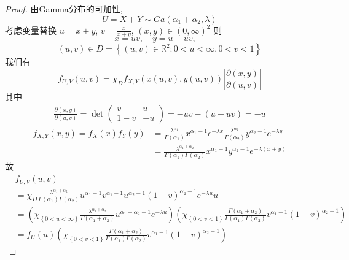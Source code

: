 \documentclass[../main.tex]{subfiles}
\begin{document}
\begin{proof}
  由Gamma分布的可加性, \[
  U= X+ Y\sim Ga\left( \alpha _1 + \alpha _2 , \lambda  \right) 
  \] 考虑变量替换 \(  u= x+ y  \), \(  v= \frac{x}{x+ y}  \), \(  \left( x,y \right)\in \left( 0,\infty \right)^{2}    \) 则   \[
  x= uv,\quad y= u-uv,\quad 
  \] \[
   \left( u,v \right)\in D= \left\{ \left( u,v \right)\in \mathbb{R} ^{2}: 0< u< \infty, 0< v< 1  \right\} 
  \]我们有\[
  f_{U,V}\left( u,v \right)=\chi _{D} f_{X,Y}\left( x\left( u,v \right),y\left( u,v \right)   \right)\left| \frac{\partial \left( x,y \right) }{\partial \left( u,v \right) }   \right| 
  \]其中 \[
  \begin{aligned}
  \frac{\partial \left( x,y \right) }{\partial \left( u,v \right) }= \det \begin{pmatrix} 
      v&u\\ 
       1-v&-u 
  \end{pmatrix}  = -uv-\left( u-uv \right) = -u
  \end{aligned}
  \] \[
  \begin{aligned}
  f_{X,Y}\left( x,y \right)= f_{X}\left( x \right)f_{Y}\left( y \right)&= \frac{ \lambda ^{ \alpha _1 } }{ \Gamma \left(  \alpha _1  \right)  }x^{ \alpha _1  -1}e^{- \lambda x} \frac{ \lambda ^{\alpha _2 } }{ \Gamma \left(  \alpha _2  \right)  }y^{\alpha _2  -1}e^{- \lambda y}  \\ 
   &= \frac{ \lambda ^{\alpha _1 + \alpha _2 } }{ \Gamma \left(  \alpha _1  \right) \Gamma \left(  \alpha _2  \right)   }x^{ \alpha _1  -1} y^{ \alpha _2   -1} e^{- \lambda \left( x+ y \right) } 
  \end{aligned} 
  \]故 \[
  \begin{aligned}
 & f_{U,V}\left( u,v \right)\\ 
  &= \chi _{D} \frac{ \lambda ^{\alpha _1 + \alpha _2 } }{ \Gamma \left(  \alpha _1  \right) \Gamma \left( \alpha _2  \right)   }   u^{\alpha _1   -1}v^{ \alpha _1 -1}u^{\alpha _2 -1}\left( 1-v \right)^{ \alpha _2 -1} e^{- \lambda u}u\\ 
   &= \left( \chi _{\left\{ 0< u< \infty \right\}}\frac{ \lambda ^{\alpha _1 + \alpha _2 } }{ \Gamma \left( \alpha _1 + \alpha _2  \right)  } u^{ \alpha _1 + \alpha _2 -1}e^{- \lambda u} \right) \left( \chi _{\left\{ 0< v< 1 \right\}} \frac{ \Gamma \left( \alpha _1 + \alpha _2  \right)   }{\Gamma \left(  \alpha _1  \right) \Gamma \left( \alpha _2  \right)   }v^{\alpha _1 -1}\left( 1-v \right)^{\alpha _2 -1} \right)  \\ 
    &= f_{U}\left( u \right) \left( \chi _{\left\{ 0< v< 1 \right\}} \frac{ \Gamma \left( \alpha _1 + \alpha _2  \right)   }{\Gamma \left(  \alpha _1  \right) \Gamma \left( \alpha _2  \right)   }v^{\alpha _1 -1}\left( 1-v \right)^{\alpha _2 -1} \right)   

\end{aligned}\]
\end{proof}
\end{document}
